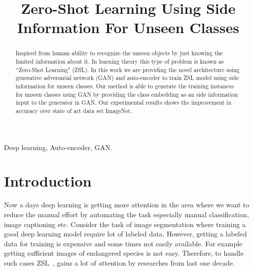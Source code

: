 \documentclass[11pt, conference, english]{IEEEtran}
\title{Zero-Shot Learning Using Side Information For Unseen Classes}
\author{
	\IEEEauthorblockN{Sanidhay Bhambay}
	\IEEEauthorblockA{Samsung Electro-Mechanics Software India Bangalore Pvt Limited\\
		\{sanidhay.bhambay\}@samsung.com}%
}
\theoremstyle{plain}
\theoremstyle{definition}
\theoremstyle{remark}
\begin{document}
{}

	\maketitle 
	\begin{abstract}
		Inspired from human ability to recognize the unseen objects by just knowing the limited information about it. In learning theory this type of problem is known as ``Zero-Shot Learning" (ZSL). In this work we are providing the novel architecture using generative adversarial network (GAN) and auto-encoder to train ZSL model using side information for unseen classes. Our method is able to generate the training instances for unseen classes using GAN by providing the class embedding as an side information input to the generator in GAN. Our experimental results shows the improvement in accuracy over state of art data set ImageNet. 
		
		
		
		
		
		
		
		
	\end{abstract}
	\begin{IEEEkeywords}
		Deep learning, Auto-encoder, GAN.
	\end{IEEEkeywords}
	\section{Introduction}
	Now a days deep learning is getting more attention in the area where we want to reduce the 
	manual effort by automating the task especially manual classification, image captioning etc. Consider the task of image segmentation where training a good deep learning model require lot of labeled data. However, getting a labeled data for training is expensive and some times not easily available. For example getting sufficient images of endangered species is not easy. Therefore, to handle such cases ZSL~\cite{palatucci2009zero}, gains a lot of attention by researches from last one decade.
	
\end{document}
